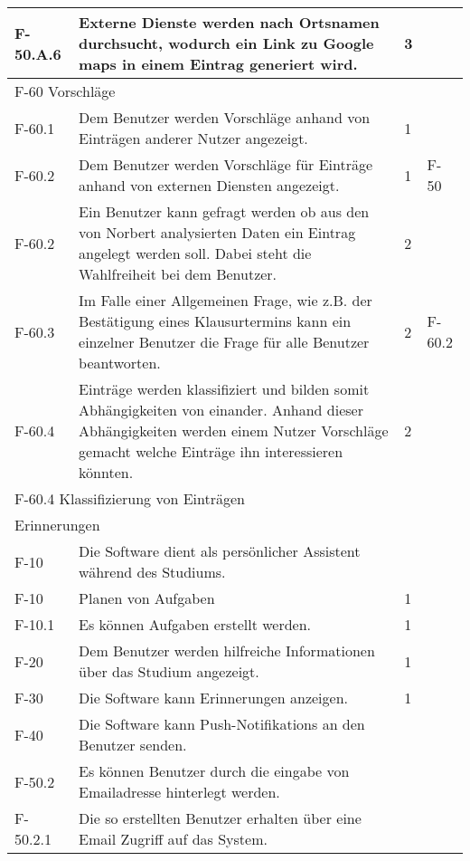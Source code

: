 \begin{tabularx}{\textwidth}{|l|X|l|l|}
    F-50.A.6 & Externe Dienste werden nach Ortsnamen durchsucht, wodurch ein Link zu Google maps in einem Eintrag generiert wird. & 3 & \\
    \hline
    \multicolumn{4}{|l|}{F-60 Vorschläge}\\
    \hline 
    F-60.1 & Dem Benutzer werden Vorschläge anhand von Einträgen anderer Nutzer angezeigt. & 1 & \\
    F-60.2 & Dem Benutzer werden Vorschläge für Einträge anhand von externen Diensten angezeigt. & 1 & F-50 \\
    F-60.2 & Ein Benutzer kann gefragt werden ob aus den von Norbert analysierten Daten ein Eintrag angelegt werden soll. Dabei steht die Wahlfreiheit bei dem Benutzer. & 2 & \\
    F-60.3 & Im Falle einer Allgemeinen Frage, wie z.B. der Bestätigung eines Klausurtermins kann ein einzelner Benutzer die Frage für alle Benutzer beantworten. & 2 & F-60.2 \\
    F-60.4 & Einträge werden klassifiziert und bilden somit Abhängigkeiten von einander. Anhand dieser Abhängigkeiten werden einem Nutzer Vorschläge gemacht welche Einträge ihn interessieren könnten. & 2 & \\

    \hline
    \multicolumn{4}{|l|}{F-60.4 Klassifizierung von Einträgen}\\
    \hline

    \hline
    \multicolumn{4}{|l|}{Erinnerungen}\\
    \hline

    F-10 & Die Software dient als persönlicher Assistent während des Studiums. & & \\
    F-10 & Planen von Aufgaben & 1 & \\
    F-10.1 & Es können Aufgaben erstellt werden. & 1 & \\

    F-20 & Dem Benutzer werden hilfreiche Informationen über das Studium angezeigt. & 1 & \\

    F-30 & Die Software kann Erinnerungen anzeigen. & 1 & \\

    F-40 & Die Software kann Push-Notifikations an den Benutzer senden. & & \\

    F-50.2 & Es können Benutzer durch die eingabe von Emailadresse hinterlegt werden. & & \\
    F-50.2.1 & Die so erstellten Benutzer erhalten über eine Email Zugriff auf das System. & & \\ %
    

\end{tabularx}

